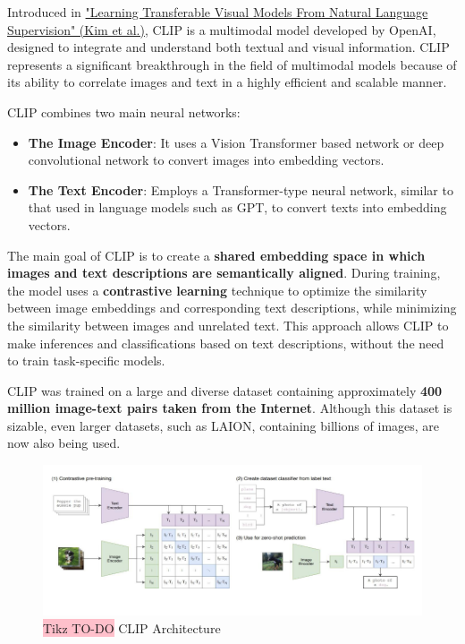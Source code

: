 Introduced in \href{https://arxiv.org/pdf/2103.00020}{"Learning Transferable Visual Models From Natural Language Supervision" (Kim et al.)}, CLIP is a multimodal model developed by OpenAI, designed to integrate and understand both textual and visual information. CLIP represents a significant breakthrough in the field of multimodal models because of its ability to correlate images and text in a highly efficient and scalable manner.

CLIP combines two main neural networks:
\begin{itemize}
    \item \textbf{The Image Encoder}: It uses a Vision Transformer based network or deep convolutional network to convert images into embedding vectors.
    \item \textbf{The Text Encoder}: Employs a Transformer-type neural network, similar to that used in language models such as GPT, to convert texts into embedding vectors.
\end{itemize}

The main goal of CLIP is to create a \textbf{shared embedding space in which images and text descriptions are semantically aligned}. During training, the model uses a \textbf{contrastive learning} technique to optimize the similarity between image embeddings and corresponding text descriptions, while minimizing the similarity between images and unrelated text. This approach allows CLIP to make inferences and classifications based on text descriptions, without the need to train task-specific models.

CLIP was trained on a large and diverse dataset containing approximately \textbf{400 million image-text pairs taken from the Internet}. Although this dataset is sizable, even larger datasets, such as LAION, containing billions of images, are now also being used.

\begin{figure}[!htbp]
    \centering
    \includegraphics[width=\linewidth]{tikz/chapter11 - CLIP.png}
    \caption{{\color{red}\colorbox{pink}{Tikz TO-DO}} CLIP Architecture}
\end{figure}

